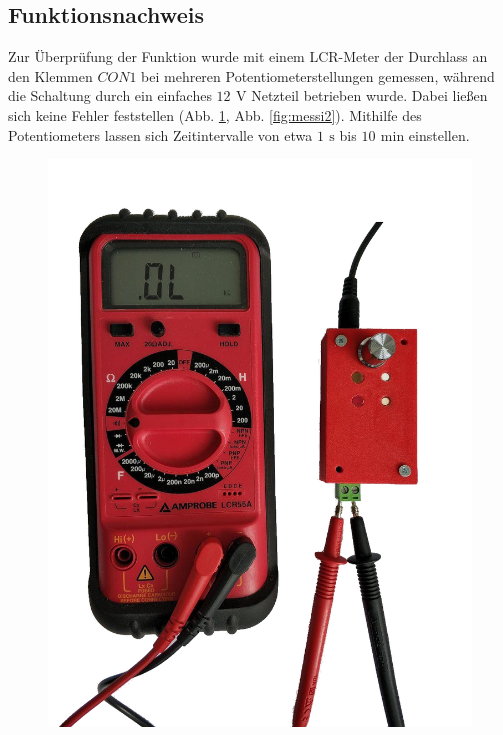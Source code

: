 \documentclass[a4paper, 12pt]{article}
\begin{document}
  \subsection{Funktionsnachweis}
    Zur Überprüfung der Funktion wurde mit einem LCR-Meter der Durchlass an den Klemmen $CON1$ bei mehreren Potentiometerstellungen gemessen, während die Schaltung durch ein einfaches $12 \,\ \si{\volt}$ Netzteil betrieben wurde. Dabei ließen sich keine Fehler feststellen (Abb. \ref{fig:messi1}, Abb. \ref{fig:messi2}).
    Mithilfe des Potentiometers lassen sich Zeitintervalle von etwa $1 \,\  \si{\second}$ bis $10 \,\  \si{\minute}$ einstellen.

    \begin{figure}[h!]
    \centering
      \begin{minipage}{.5\textwidth}
        \centering
        \includegraphics[width=.9\linewidth]{graphics/messi1.png}
        \label{fig:messi1}
      \end{minipage}%
      \begin{minipage}{.5\textwidth}

\end{minipage}
\end{figure}
\end{document}
